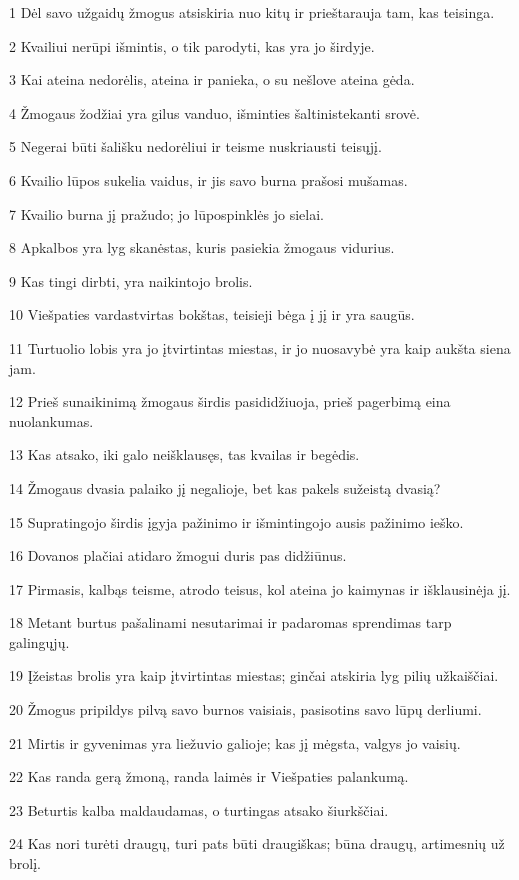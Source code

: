 \par 1 Dėl savo užgaidų žmogus atsiskiria nuo kitų ir prieštarauja tam, kas teisinga. 
\par 2 Kvailiui nerūpi išmintis, o tik parodyti, kas yra jo širdyje. 
\par 3 Kai ateina nedorėlis, ateina ir panieka, o su nešlove ateina gėda. 
\par 4 Žmogaus žodžiai yra gilus vanduo, išminties šaltinis­tekanti srovė. 
\par 5 Negerai būti šališku nedorėliui ir teisme nuskriausti teisųjį. 
\par 6 Kvailio lūpos sukelia vaidus, ir jis savo burna prašosi mušamas. 
\par 7 Kvailio burna jį pražudo; jo lūpos­pinklės jo sielai. 
\par 8 Apkalbos yra lyg skanėstas, kuris pasiekia žmogaus vidurius. 
\par 9 Kas tingi dirbti, yra naikintojo brolis. 
\par 10 Viešpaties vardas­tvirtas bokštas, teisieji bėga į jį ir yra saugūs. 
\par 11 Turtuolio lobis yra jo įtvirtintas miestas, ir jo nuosavybė yra kaip aukšta siena jam. 
\par 12 Prieš sunaikinimą žmogaus širdis pasididžiuoja, prieš pagerbimą eina nuolankumas. 
\par 13 Kas atsako, iki galo neišklausęs, tas kvailas ir begėdis. 
\par 14 Žmogaus dvasia palaiko jį negalioje, bet kas pakels sužeistą dvasią? 
\par 15 Supratingojo širdis įgyja pažinimo ir išmintingojo ausis pažinimo ieško. 
\par 16 Dovanos plačiai atidaro žmogui duris pas didžiūnus. 
\par 17 Pirmasis, kalbąs teisme, atrodo teisus, kol ateina jo kaimynas ir išklausinėja jį. 
\par 18 Metant burtus pašalinami nesutarimai ir padaromas sprendimas tarp galingųjų. 
\par 19 Įžeistas brolis yra kaip įtvirtintas miestas; ginčai atskiria lyg pilių užkaiščiai. 
\par 20 Žmogus pripildys pilvą savo burnos vaisiais, pasisotins savo lūpų derliumi. 
\par 21 Mirtis ir gyvenimas yra liežuvio galioje; kas jį mėgsta, valgys jo vaisių. 
\par 22 Kas randa gerą žmoną, randa laimės ir Viešpaties palankumą. 
\par 23 Beturtis kalba maldaudamas, o turtingas atsako šiurkščiai. 
\par 24 Kas nori turėti draugų, turi pats būti draugiškas; būna draugų, artimesnių už brolį.



